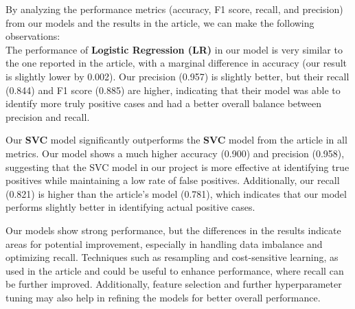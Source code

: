 By analyzing the performance metrics (accuracy, F1 score, recall, and precision) from our models and the results in the article, we can make the following observations:
\\
The performance of \textbf{Logistic Regression (LR)} in our model is very similar to the one reported in the article, with a marginal difference in accuracy (our result is slightly lower by 0.002). Our precision (0.957) is slightly better, but their recall (0.844) and F1 score (0.885) are higher, indicating that their model was able to identify more truly positive cases and had a better overall balance between precision and recall.

Our \textbf{SVC} model significantly outperforms the \textbf{SVC} model from the article in all metrics. Our model shows a much higher accuracy (0.900) and precision (0.958), suggesting that the SVC model in our project is more effective at identifying true positives while maintaining a low rate of false positives. Additionally, our recall (0.821) is higher than the article's model (0.781), which indicates that our model performs slightly better in identifying actual positive cases.

 Our models show strong performance, but the differences in the results indicate areas for potential improvement, especially in handling data imbalance and optimizing recall. Techniques such as resampling and cost-sensitive learning, as used in the article and could be useful to enhance performance, where recall can be further improved. Additionally, feature selection and further hyperparameter tuning may also help in refining the models for better overall performance.